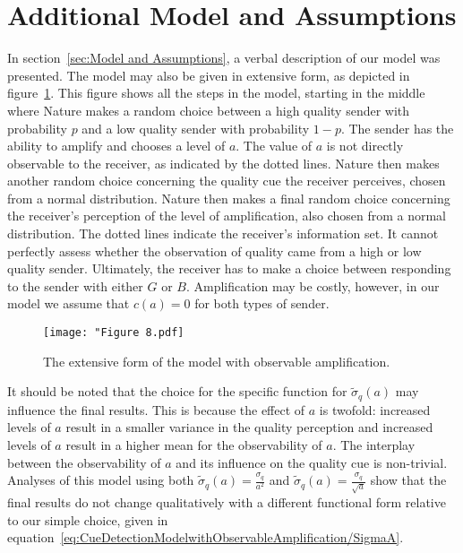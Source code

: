 \documentclass[a4paper,12pt]{article}
\numberwithin{equation}{section}
\numberwithin{figure}{section}
\begin{document}
\listoffigures

\newpage


\appendix

\section{Additional Model and Assumptions}
\label{sec:Additional Model and Assumptions}

In section~\ref{sec:Model and Assumptions}, a verbal description of our model was presented. The model may also be given in extensive form, as depicted in figure~\ref{fig:Figure 8.pdf}. This figure shows all the steps in the model, starting in the middle where Nature makes a random choice between a high quality sender with probability $p$ and a low quality sender with probability $1-p$. The sender has the ability to amplify and chooses a level of $a$. The value of $a$ is not directly observable to the receiver, as indicated by the dotted lines. Nature then makes another random choice concerning the quality cue the receiver perceives, chosen from a normal distribution. Nature then makes a final random choice concerning the receiver's perception of the level of amplification, also chosen from a normal distribution. The dotted lines indicate the receiver's information set. It cannot perfectly assess whether the observation of quality came from a high or low quality sender. Ultimately, the receiver has to make a choice between responding to the sender with either $G$ or $B$. Amplification may be costly, however, in our model we assume that $c(a)=0$ for both types of sender.

\begin{figure}[h]
\begin{center}
\leavevmode
\texttt{[image: "Figure 8.pdf]}
\caption[]{The extensive form of the model with observable amplification.}
\label{fig:Figure 8.pdf}
\end{center}
\end{figure}

It should be noted that the choice for the specific function for $\tilde{\sigma}_{q}(a)$ may influence the final results. This is because the effect of $a$ is twofold: increased levels of $a$ result in a smaller variance in the quality perception and increased levels of $a$ result in a higher mean for the observability of $a$. The interplay between the observability of $a$ and its influence on the quality cue is non-trivial. Analyses of this model using both $\tilde{\sigma}_{q}(a)=\frac{\sigma_{q}}{a^2}$ and $\tilde{\sigma}_{q}(a)=\frac{\sigma_{q}}{\sqrt{a}}$ show that the final results do not change qualitatively with a different functional form relative to our simple choice, given in equation~\ref{eq:CueDetectionModelwithObservableAmplification/SigmaA}.
\end{document}
